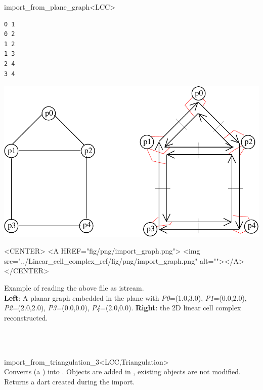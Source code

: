 \begin{ccRefFunction}{import_from_plane_graph<LCC>}
\begin{verbatim}
0 1
0 2
1 2
1 3
2 4
3 4
\end{verbatim}
%
\def\LargFig{.6\textwidth}
  \begin{ccTexOnly}
    \begin{center}
      \includegraphics[width=\LargFig]{Linear_cell_complex_ref/fig/pdf/import_graph}
    \end{center}
  \end{ccTexOnly}
  \begin{ccHtmlOnly}
    <CENTER>
    <A HREF="fig/png/import_graph.png">
        <img src="../Linear_cell_complex_ref/fig/png/import_graph.png" alt=""></A>
    </CENTER>
    \end{ccHtmlOnly}
    \begin{center}
      Example of  reading the above file as istream. \\
      \textbf{Left}: A planar graph embedded in the plane with 
      \emph{P0}=(1.0,3.0), \emph{P1}=(0.0,2.0), \emph{P2}=(2.0,2.0), \emph{P3}=(0.0,0.0), \emph{P4}=(2.0,0.0).
      \textbf{Right}: the 2D linear cell complex reconstructed.
      \end{center}
\ccSeeAlso
{}\\
\\
\end{ccRefFunction}
\begin{ccRefFunction}{import_from_triangulation_3<LCC,Triangulation>}
\\

 {Converts  (a ) into . 
   Objects are added in , existing objects are not modified.
   Returns a dart created during the import.
 }
\ccSeeAlso
{}\\
\\
\end{ccRefFunction}
